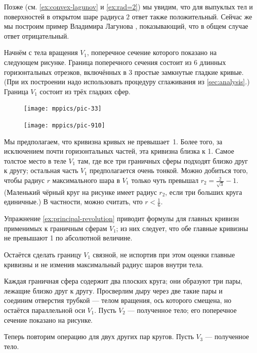 Позже (см. \ref{ex:convex-lagunov} и \ref{ex:rad=2})
мы увидим, что для выпуклых тел и поверхностей в открытом шаре радиуса $2$ ответ также положительный.
Сейчас же мы построим пример Владимира Лагунова \cite{lagunov-1961}, показывающий, что в общем случае ответ отрицательный.

Начнём с тела вращения $V_1$, поперечное сечение которого показано на следующем рисунке.
Граница поперечного сечения состоит из 6 длинных горизонтальных отрезков, включённых в 3 простые замкнутые гладкие кривые.
(При их построении надо использовать процедуру сглаживания из \ref{sec:analysis}.)
Граница $V_1$ состоит из трёх гладких сфер.

\begin{figure}[hb!]
\centering
\texttt{[image: mppics/pic-33]}
\vskip0mm
\end{figure}

\begin{figure}
\vskip-0mm
\centering
\texttt{[image: mppics/pic-910]}
\vskip0mm
\end{figure}

Мы предполагаем, что кривизна кривых не превышает~1.
Более того, за исключением почти горизонтальных частей, эта кривизна близка к 1.
Самое толстое место в теле $V_1$ там, где все три граничных сферы подходят близко друг к другу;
остальная часть $V_1$ предполагается очень тонкой.
Можно добиться того, чтобы радиус $r$ максимального шара в $V_1$ только чуть превышал $r_2=\tfrac2{\sqrt{3}}-1$.
(Маленький чёрный круг на рисунке имеет радиус $r_2$, если три больших круга единичные.)
В частности, можно считать, что $r<\tfrac16$.

Упражнение \ref{ex:principal-revolution} приводит формулы для главных кривизн применимых к граничным сферам $V_1$;
из них следует, что обе главные кривизны не превышают 1 по абсолютной величине.

Остаётся сделать границу $V_1$ связной, не испортив при этом оценки главные кривизны и не изменив максимальный радиус шаров внутри тела.

Каждая граничная сфера содержит два плоских круга; они образуют три пары, лежащие близко друг к другу.
Просверлим дыру через две такие пары и соединим отверстия трубкой --- телом вращения, ось которого смещена, но остаётся параллельной оси $V_1$.
Пусть $V_2$ --- полученное тело; его поперечное сечение показано на рисунке.

Теперь повторим операцию для двух других пар кругов.
Пусть $V_3$ --- полученное тело.

